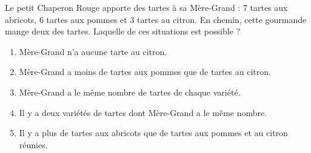 Le petit Chaperon Rouge apporte des tartes à sa Mère-Grand : 7 tartes aux abricots, 6 tartes aux pommes et 3 tartes au citron. En chemin, cette gourmande mange deux des tartes. Laquelle de ces situations est possible ?
\begin{enumerate}[A/]
\item Mère-Grand n'a aucune tarte au citron.
\item Mère-Grand a moins de tartes aux pommes que de tartes au citron.
\item Mère-Grand a le même nombre de tartes de chaque variété.
\item Il y a deux variétés de tartes dont Mère-Grand a le même nombre.
\item Il y a plus de tartes aux abricots que de tartes aux pommes et au citron réunies.
\end{enumerate}